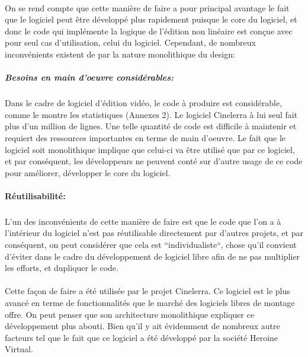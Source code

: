 \paragraph{}

On se rend compte que cette manière de faire a pour principal avantage
le fait que le logiciel peut être développé plus rapidement puisque
le core du logiciel, et donc le code qui implémente la logique de
l'édition non linéaire est conçue avec pour seul cas d'utilisation,
celui du logiciel. Cependant, de nombreux inconvénients existent de
par la nature monolithique du design:

\subparagraph{Besoins en main d'oeuvre considérables:}

\subparagraph { }

Dans le cadre de logiciel d'édition vidéo, le code à produire
est considérable, comme le montre les statistiques (Annexes 2). Le
logiciel Cinelerra à lui seul fait plus d'un million de lignes. Une
telle quantité de code est difficile à maintenir et requiert des
ressources importantes en terme de main d'oeuvre. Le fait que le logiciel
soit monolithique implique que celui-ci va être utilisé que par ce
logiciel, et par conséquent, les développeurs ne peuvent conté sur
d'autre usage de ce code pour améliorer, développer le core du logiciel.

\paragraph{Réutilisabilité:}

\subparagraph { }

L'un des inconvénients de cette manière de faire est que le code que
l'on a à l'intérieur du logiciel n'est pas réutilisable directement
par d'autres projets, et par conséquent, on peut considérer que cela
est ``individualiste``, chose qu'il convient d'éviter dans le cadre du
développement de logiciel libre afin de ne pas multiplier les efforts,
et dupliquer le code.

\paragraph{}

Cette façon de faire a été utilisée par le projet Cinelerra. Ce
logiciel est le plus avancé en terme de fonctionnalités que le marché
des logiciels libres de montage offre. On peut penser que son architecture
monolithique expliquer ce développement plus abouti. Bien qu'il y ait
évidemment de nombreux autre facteurs tel que le fait que ce logiciel
a été développé par la société Heroine Virtual.

